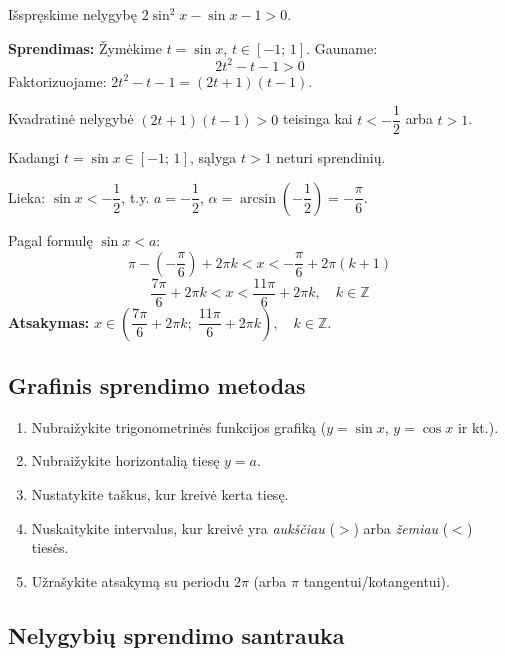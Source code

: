 \begin{example}
Išspręskime nelygybę $2\sin^2 x - \sin x - 1 > 0$.

\textbf{Sprendimas:} Žymėkime $t = \sin x$, $t \in [-1;\, 1]$. Gauname:
\[
2t^2 - t - 1 > 0
\]
Faktorizuojame: $2t^2 - t - 1 = (2t + 1)(t - 1)$.

Kvadratinė nelygybė $(2t+1)(t-1) > 0$ teisinga kai $t < -\dfrac{1}{2}$ arba $t > 1$.

Kadangi $t = \sin x \in [-1;\, 1]$, sąlyga $t > 1$ neturi sprendinių.

Lieka: $\sin x < -\dfrac{1}{2}$, t.y. $a = -\dfrac{1}{2}$, $\alpha = \arcsin\!\left(-\dfrac{1}{2}\right) = -\dfrac{\pi}{6}$.

Pagal formulę $\sin x < a$:
\[
\pi - \left(-\frac{\pi}{6}\right) + 2\pi k < x < -\frac{\pi}{6} + 2\pi(k+1)
\]
\[
\frac{7\pi}{6} + 2\pi k < x < \frac{11\pi}{6} + 2\pi k, \quad k \in \mathbb{Z}
\]
\textbf{Atsakymas:} $x \in \left(\dfrac{7\pi}{6} + 2\pi k;\; \dfrac{11\pi}{6} + 2\pi k\right), \quad k \in \mathbb{Z}$.
\end{example}

\subsection{Grafinis sprendimo metodas}

\begin{tcolorbox}[colback=gray!5!white, colframe=gray!60!black, title=Algoritmas: grafinis metodas]
\begin{enumerate}[label=\arabic*.]
    \item Nubraižykite trigonometrinės funkcijos grafiką ($y = \sin x$, $y = \cos x$ ir kt.).
    \item Nubraižykite horizontalią tiesę $y = a$.
    \item Nustatykite taškus, kur kreivė kerta tiesę.
    \item Nuskaitykite intervalus, kur kreivė yra \emph{aukščiau} ($>$) arba \emph{žemiau} ($<$) tiesės.
    \item Užrašykite atsakymą su periodu $2\pi$ (arba $\pi$ tangentui/kotangentui).
\end{enumerate}
\end{tcolorbox}

\subsection{Nelygybių sprendimo santrauka}

